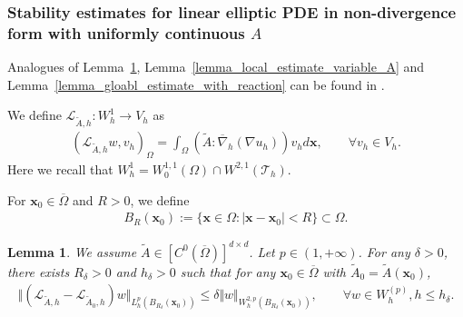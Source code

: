 \documentclass[12pt]{amsart}
\newcommand{\boldx}{\boldsymbol{x}}
\newtheorem{lemma}{Lemma}[section]
\theoremstyle{definition}
\theoremstyle{remark}
\begin{document}
\subsubsection{Stability estimates for linear elliptic PDE in non-divergence form with uniformly continuous $A$}

Analogues of Lemma~\ref{lemma_diff_A_variable_constant}, Lemma~\ref{lemma_local_estimate_variable_A} 
and Lemma~\ref{lemma_gloabl_estimate_with_reaction} can be found in \cite{FHM2017}.

We define $\mathcal{L}_{\tilde{A},h}: W_{h}^{1} \rightarrow V_{h}$ as 
\begin{align}
\label{L_h_operator}
(\mathcal{L}_{\tilde{A},h}w, v_{h})_{\Omega} = \int_{\Omega}(\tilde{A}: \overline{\nabla}_{h}(\nabla u_{h}))v_{h} d\boldx, 
\qquad \forall v_{h} \in V_{h}.
\end{align}
Here we recall that $W_{h}^{1} = W_{0}^{1,1}(\Omega)\cap W^{2,1}(\mathcal{T}_{h})$.

For $\boldx_{0} \in \overline{\Omega}$ and $R > 0$, we define 
\begin{align*}
B_{R}(\boldx_{0}) := \{ \boldx \in \Omega: \vert \boldx - \boldx_{0} \vert < R \} \subset \Omega.
\end{align*}

\begin{lemma}
\label{lemma_diff_A_variable_constant}
We assume $\tilde{A} \in [C^{0}(\overline{\Omega})]^{d \times d}$.
Let $p \in (1,+\infty)$. For any $\delta > 0$, there exists $R_{\delta}>0$ and $h_{\delta} > 0$ such that for 
any $\boldx_{0}\in \overline{\Omega}$ with $\tilde{A}_{0} = \tilde{A}(\boldx_{0})$, 
\begin{align*}
\Vert (\mathcal{L}_{\tilde{A},h} - \mathcal{L}_{\tilde{A}_{0},h})w\Vert_{L_{h}^{p}(B_{R_{\delta}}(\boldx_{0}))} 
\leq \delta \Vert w\Vert_{W_{h}^{2,p}(B_{R_{\delta}}(\boldx_{0}))}, \qquad \forall 
w \in W_{h}^{(p)}, h\leq h_{\delta}. 
\end{align*}
\end{lemma}
\end{document}
